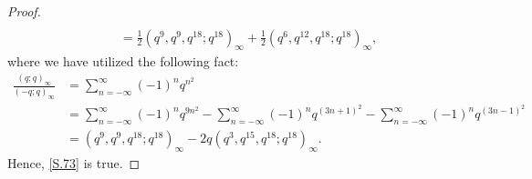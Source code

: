 \documentclass[10pt,a4paper]{amsart}
\begin{document}
\begin{proof}
\begin{align}
\nonumber\\
&\quad=\frac{1}{2}\left(q^9,q^9,q^{18};q^{18}\right)_{\infty}
+\frac{1}{2}\left(q^6,q^{12},q^{18};q^{18}\right)_{\infty},
\end{align}
where we have utilized the following fact:
\begin{align}
\frac{\left(q;q\right)_{\infty}}{\left(-q;q\right)_{\infty}}
&=\sum_{n=-\infty}^{\infty}\left(-1\right)^nq^{n^2}\nonumber\\
&=\sum_{n=-\infty}^{\infty}\left(-1\right)^nq^{9n^2}
-\sum_{n=-\infty}^{\infty}\left(-1\right)^nq^{\left(3n+1\right)^2}
-\sum_{n=-\infty}^{\infty}\left(-1\right)^nq^{\left(3n-1\right)^2}\nonumber\\
&=\left(q^9,q^9,q^{18};q^{18}\right)_{\infty}
-2q\left(q^3,q^{15},q^{18};q^{18}\right)_{\infty}.\label{A8}
\end{align}
Hence, \eqref{S.73} is true.


\end{proof}
\end{document}
